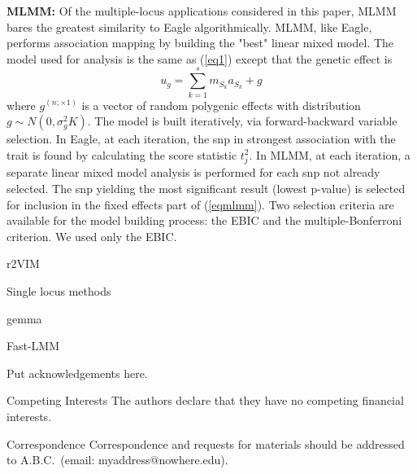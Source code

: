 \documentclass{nature}
\begin{document}
\textbf{MLMM:}  Of the multiple-locus applications considered in this paper, 
MLMM bares the greatest similarity to Eagle algorithmically.  MLMM, like Eagle, performs 
association mapping by building the "best" linear mixed model.  The model used for analysis 
is the same as (\ref{eq1}) except that the genetic effect is 
\begin{equation}
\label{eqmlmm}
u_g = \sum_{k=1}^s  m_{S_k} a_{S_k} + g
\end{equation}
where 
$g^{(n ; \times 1)}$ is a vector of random polygenic effects with distribution 
$g \sim N(0, \sigma^2_g K)$. The model is built iteratively, via forward-backward variable selection.  In Eagle, at each iteration, 
the snp in strongest association with the trait is found by calculating the score statistic $t_j^2$.  In MLMM, at each iteration, 
a separate linear mixed model analysis is performed for each snp not already selected. The snp yielding the most 
significant result (lowest p-value) is selected for inclusion in the fixed effects part of (\ref{eqmlmm}).  
Two selection 
criteria are available for the model building process: 
the EBIC and the multiple-Bonferroni criterion. We used only the EBIC. 



  
   
  r2VIM
  
 
  


Single locus methods

gemma

Fast-LMM





\begin{addendum}
 \item Put acknowledgements here.
 \item[Competing Interests] The authors declare that they have no
competing financial interests.
 \item[Correspondence] Correspondence and requests for materials
should be addressed to A.B.C.~(email: myaddress@nowhere.edu).
\end{addendum}
\end{document}
